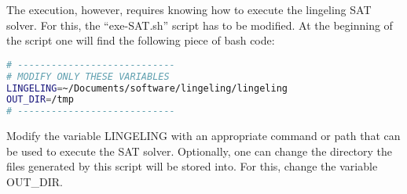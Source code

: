 The execution, however, requires knowing how to execute the lingeling SAT solver.
For this, the ``exe-SAT.sh'' script has to be modified. At the beginning of the
script one will find the following piece of bash code:

\begin{lstlisting}[language=bash]
# ----------------------------
# MODIFY ONLY THESE VARIABLES
LINGELING=~/Documents/software/lingeling/lingeling
OUT_DIR=/tmp
# ----------------------------
\end{lstlisting}

Modify the variable LINGELING with an appropriate command or path that can be used
to execute the SAT solver. Optionally, one can change the directory the files generated
by this script will be stored into. For this, change the variable OUT\_DIR.